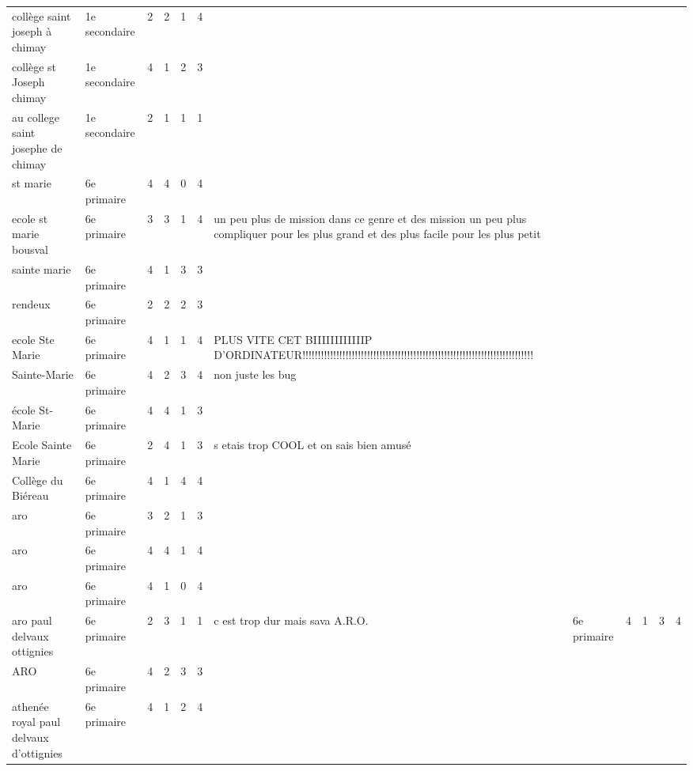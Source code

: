 \begin{table}
\begin{center}
\begin{tabular}{|l|l|l|l|l|l|l|}
collège saint joseph à chimay&1e secondaire&2&2&1&4&\\
collège st Joseph chimay&1e secondaire&4&1&2&3&\\
au college saint josephe de chimay&1e secondaire&2&1&1&1&\\
st marie &6e primaire&4&4&0&4&\\
ecole st marie bousval&6e primaire&3&3&1&4&un peu plus de mission dans ce genre et des mission un peu plus compliquer pour les plus grand et des plus facile pour les plus petit\\
sainte marie&6e primaire&4&1&3&3&\\
rendeux&6e primaire&2&2&2&3&\\
ecole Ste Marie&6e primaire&4&1&1&4&PLUS VITE CET BIIIIIIIIIIIIP D'ORDINATEUR!!!!!!!!!!!!!!!!!!!!!!!!!!!!!!!!!!!!!!!!!!!!!!!!!!!!!!!!!!!!!!!!!!!!!!!!!!!\\
Sainte-Marie&6e primaire&4&2&3&4&non juste les bug\\
école St-Marie&6e primaire&4&4&1&3&\\
Ecole Sainte Marie&6e primaire&2&4&1&3&s etais trop COOL et on sais bien amusé\\
Collège du Biéreau&6e primaire&4&1&4&4&\\
aro&6e primaire&3&2&1&3&\\
aro&6e primaire&4&4&1&4&\\
aro&6e primaire&4&1&0&4&\\
 aro paul delvaux ottignies&6e primaire&2&3&1&1&c est trop dur mais sava
A.R.O.&6e primaire&4&1&3&4&\\
ARO&6e primaire&4&2&3&3&\\
athenée royal paul delvaux d'ottignies&6e primaire&4&1&2&4&\\
    \end{tabular}
  \end{center}
\end{table}

